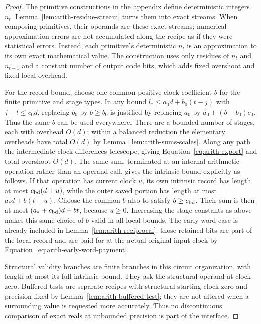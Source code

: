 \documentclass[11pt]{article}
\numberwithin{equation}{section}
\theoremstyle{definition}
\theoremstyle{remark}
\begin{document}
\begin{proof}
The primitive constructions in the appendix define deterministic integers ${n}_t$.
Lemma~\ref{lem:arith-residue-stream}
turns them into exact streams.  When composing primitives,
their operands are these exact streams; numerical approximation
errors are not accumulated along the recipe as if they were
statistical errors.  Instead, each primitive's deterministic
${n}_t$ is an approximation to its own exact mathematical value.
The construction uses only residues of ${n}_t$ and ${n}_{t-1}$ and
a constant number of output code bits, which adds fixed
overshoot and fixed local overhead.

For the record bound, choose one common positive clock
coefficient $b$ for the finite primitive and stage types.  In any
bound ${l_*}\leq a_0d+b_0(t-j)$ with $j-t\leq c_0d$, replacing
$b_0$ by $b\geq b_0$ is justified by replacing $a_0$ by
$a_0+(b-b_0)c_0$.  Thus the same $b$ can be used everywhere.
There are a bounded number of stages, each with overhead $O(d)$;
within a balanced reduction the elementary overheads have total
$O(d)$ by Lemma~\ref{lem:arith-sums-scales}.  Along any path
the intermediate clock differences telescope, giving
Equation~\eqref{eq:arith-export} and total overshoot $O(d)$.
The same sum, terminated at an internal arithmetic operation
rather than an operand call, gives the intrinsic bound explicitly
as follows.  If that operation has current clock $u$, its own
intrinsic record has length at most ${c_{\rm bd}}(d+u)$, while the outer
saved portion has length at most ${a_*} d+b(t-u)$.  Choose the
common $b$ also to satisfy $b\geq {c_{\rm bd}}$.  Their sum is then at most
$({a_*}+{c_{\rm bd}})d+bt$, because $u\geq0$.  Increasing the stage constants
as above makes this same choice of $b$ valid in all local bounds.
The early-word case is already included in
Lemma~\ref{lem:arith-reciprocal}: those retained bits are part of
the local record and are paid for at the actual original-input
clock by Equation~\eqref{eq:arith-early-word-payment}.

Structural validity branches are finite branches in this circuit
organization, with length at most its full intrinsic bound.
They ask the structural operand at clock zero.  Buffered tests
are separate recipes with structural starting clock zero and
precision fixed by Lemma~\ref{lem:arith-buffered-test}; they are
not altered when a surrounding value is requested more accurately.
Thus no discontinuous comparison of exact reals at unbounded
precision is part of the interface.


\end{proof}
\end{document}
